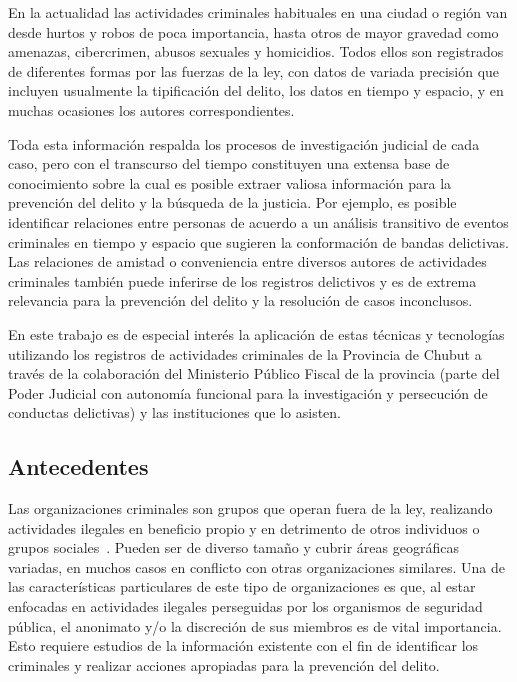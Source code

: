 
En la actualidad las actividades criminales habituales en una ciudad o región van desde hurtos y robos de poca importancia, hasta otros de mayor gravedad como amenazas, cibercrimen, abusos sexuales y  homicidios. Todos ellos son registrados de diferentes formas por las fuerzas de la ley, con datos de variada precisión que incluyen usualmente la tipificación del delito, los datos en tiempo y espacio, y en muchas ocasiones los autores correspondientes.

Toda esta información respalda los procesos de investigación judicial de cada caso, pero con el transcurso del tiempo constituyen una extensa base de conocimiento sobre la cual es posible extraer valiosa información para la prevención del delito y la búsqueda de la justicia. Por ejemplo, es posible identificar relaciones entre personas de acuerdo a un análisis transitivo de eventos criminales en tiempo y espacio que sugieren la conformación de bandas delictivas. Las relaciones de amistad o conveniencia entre diversos autores de actividades criminales también puede inferirse de los registros delictivos y es de extrema relevancia para la prevención del delito y la resolución de casos inconclusos.

En este trabajo es de especial interés la aplicación de estas técnicas y tecnologías utilizando los registros de actividades criminales de la Provincia de Chubut a través de la colaboración del Ministerio Público Fiscal de la provincia (parte del Poder Judicial con autonomía funcional para la investigación y persecución de conductas delictivas) y las instituciones que lo asisten.

\subsection{Antecedentes}
Las organizaciones criminales son grupos que operan fuera de la ley, realizando actividades ilegales en beneficio propio y en detrimento de otros individuos o grupos sociales~\cite{ref_article1}. Pueden ser de diverso tamaño y cubrir áreas geográficas variadas, en muchos casos en conflicto con otras organizaciones similares. Una de las características particulares de este tipo de organizaciones es que, al estar enfocadas en actividades ilegales perseguidas por los organismos de seguridad pública, el anonimato y/o la discreción de sus miembros es de vital importancia. Esto requiere estudios de la información existente con el fin de identificar los criminales y realizar acciones apropiadas para la prevención del delito.


